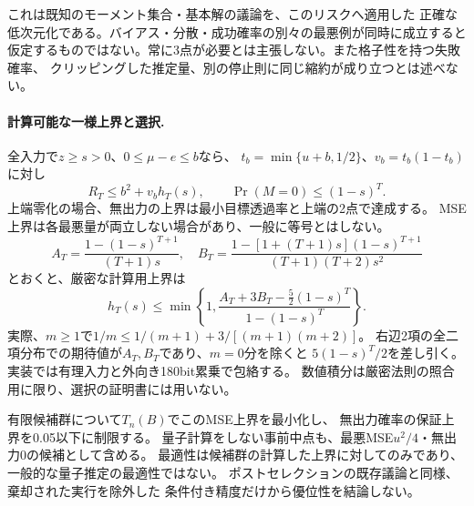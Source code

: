 これは既知のモーメント集合・基本解の議論\cite{Winkler,Pinelis}を、このリスクへ適用した
正確な低次元化である。バイアス・分散・成功確率の別々の最悪例が同時に成立すると
仮定するものではない。常に3点が必要とは主張しない。また格子性を持つ失敗確率、
クリッピングした推定量、別の停止則に同じ縮約が成り立つとは述べない。

\paragraph{計算可能な一様上界と選択.}
全入力で$z\geq s>0$、$0\leq\mu-e\leq b$なら、
$t_b=\min\{u+b,1/2\}$、$v_b=t_b(1-t_b)$に対し
\begin{equation}\label{eq:finite-upper}
 R_T\leq b^2+v_bh_T(s),\qquad \Pr(M=0)\leq(1-s)^T.
\end{equation}
上端零化の場合、無出力の上界は最小目標透過率と上端の2点で達成する。
MSE上界は各最悪量が両立しない場合があり、一般に等号とはしない。
\[
 A_T=\frac{1-(1-s)^{T+1}}{(T+1)s},\quad
 B_T=\frac{1-[1+(T+1)s](1-s)^{T+1}}{(T+1)(T+2)s^2}
\]
とおくと、厳密な計算用上界は
\begin{equation}\label{eq:inverse-upper}
 h_T(s)\leq\min\left\{1,
 \frac{A_T+3B_T-\frac52(1-s)^T}{1-(1-s)^T}\right\}.
\end{equation}
実際、$m\geq1$で$1/m\leq1/(m+1)+3/[(m+1)(m+2)]$。
右辺2項の全二項分布での期待値が$A_T,B_T$であり、$m=0$分を除くと
$5(1-s)^T/2$を差し引く。実装では有理入力と外向き180bit累乗で包絡する。
数値積分は厳密法則の照合用に限り、選択の証明書には用いない。

有限候補群について$T_n(B)$でこのMSE上界を最小化し、
無出力確率の保証上界を0.05以下に制限する。
量子計算をしない事前中点も、最悪MSE$u^2/4$・無出力0の候補として含める。
最適性は候補群の計算した上界に対してのみであり、一般的な量子推定の最適性ではない。
ポストセレクションの既存議論\cite{Combes}と同様、棄却された実行を除外した
条件付き精度だけから優位性を結論しない。
